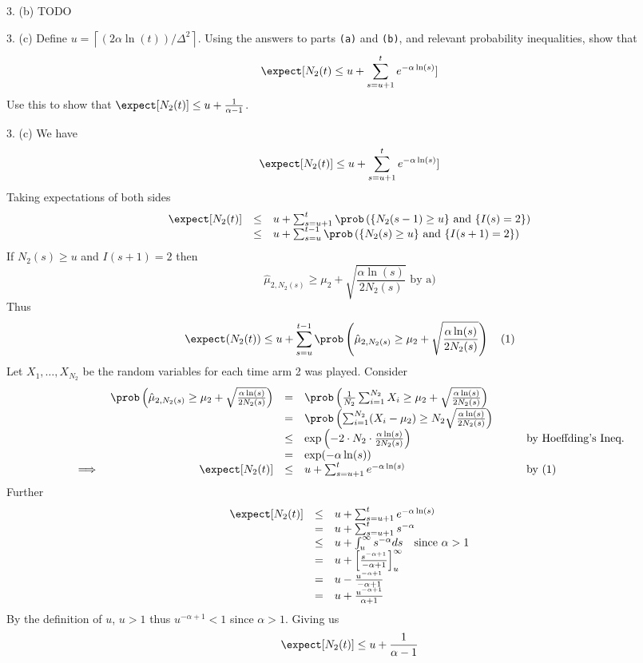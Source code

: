 \documentclass[11pt,a4paper]{article}
\begin{document}
\begin{answer}{3. (b)}
  TODO
\end{answer}

\begin{question}{3. (c)}
  Define $u=\left\lceil(2\alpha\ln(t))/\Delta^2\right\rceil$. Using the answers to parts \texttt{(a)} and \texttt{(b)}, and relevant probability inequalities, show that
  \[ \expect[N_2(t)\leq u+\sum_{s=u+1}^te^{-\alpha\ln(s)}] \]
  Use this to show that $\expect[N_2(t)]\leq u+\frac1{\alpha-1}$.
\end{question}

\begin{answer}{3. (c)}
  We have
  \[ \expect[N_2(t)]\leq u+\sum_{s=u+1}^te^{-\alpha\ln(s)}] \]
  Taking expectations of both sides
  \[\begin{array}{rcl}
  \expect[N_2(t)]&\leq&u+\sum_{s=u+1}^t\prob\left(\{N_2(s-1)\geq u\}\text{ and }\{I(s)=2\}\right)\\
  &\leq&u+\sum_{s=u}^{t-1}\prob\left(\{N_2(s)\geq u\}\text{ and }\{I(s+1)=2\}\right)
  \end{array}\]
  If $N_2(s)\geq u$ and $I(s+1)=2$ then
  \[ \hat\mu_{2,N_2(s)}\geq\mu_2+\sqrt{\frac{\alpha\ln(s)}{2N_2(s)}}\text{ by a)} \]
  Thus
  \[ \expect(N_2(t))\leq u+\sum_{s=u}^{t-1}\prob\left(\hat\mu_{2,N_2(s)}\geq\mu_2+\sqrt{\frac{\alpha\ln(s)}{2N_2(s)}}\right)\quad(1) \]
  Let $X_1,\dots,X_{N_2}$ be the random variables for each time arm 2 was played. Consider
  \[\begin{array}{rrclcl}
  &\prob\left(\hat\mu_{2,N_2(s)}\geq\mu_2+\sqrt{\frac{\alpha\ln(s)}{2N_2(s)}}\right)&=&\prob\left(\frac{1}{N_2}\sum_{i=1}^{N_2}X_i\geq\mu_2+\sqrt{\frac{\alpha\ln(s)}{2N_2(s)}}\right)&\quad&\\
  &&=&\prob\left(\sum_{i=1}^{N_2}(X_i-\mu_2)\geq N_2\sqrt{\frac{\alpha\ln(s)}{2N_2(s)}}\right)\\
  &&\leq&\text{exp}\left(-2\cdot N_2\cdot\frac{\alpha\ln(s)}{2N_2(s)}\right)&&\text{by Hoeffding's Ineq.}\\
  &&=&\text{exp}(-\alpha\ln(s))\\
  \implies&\expect[N_2(t)]&\leq&u+\sum_{s=u+1}^te^{-\alpha\ln(s)}&&\text{by (1)}
  \end{array}\]
  Further
  \[\begin{array}{rcl}
    \expect[N_2(t)]&\leq&u+\sum_{s=u+1}^te^{-\alpha\ln(s)}\\
    &=&u+\sum_{s=u+1}^ts^{-\alpha}\\
    &\leq&u+\int_u^\infty s^{-\alpha}ds\quad\text{since }\alpha>1\\
    &=&u+\left[\frac{s^{-\alpha+1}}{-\alpha+1}\right]_u^\infty\\
    &=&u-\frac{u^{-\alpha+1}}{-\alpha+1}\\
    &=&u+\frac{u^{-\alpha+1}}{\alpha+1}
  \end{array}\]
  By the definition of $u$, $u>1$ thus $u^{-\alpha+1}<1$ since $\alpha>1$. Giving us
  \[ \expect[N_2(t)]\leq u+\frac1{\alpha-1} \]
\end{answer}
\end{document}
